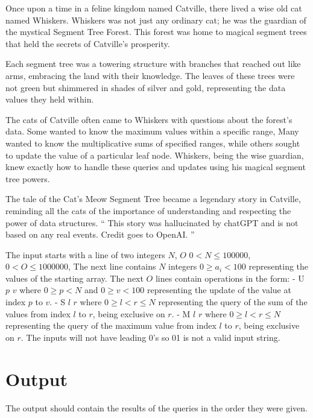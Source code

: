 Once upon a time in a feline kingdom named Catville, there lived a wise old cat named Whiskers. Whiskers was not just any ordinary cat; he was the guardian of the mystical Segment Tree Forest. This forest was home to magical segment trees that held the secrets of Catville's prosperity.

Each segment tree was a towering structure with branches that reached out like arms, embracing the land with their knowledge. The leaves of these trees were not green but shimmered in shades of silver and gold, representing the data values they held within.

The cats of Catville often came to Whiskers with questions about the forest's data. Some wanted to know the maximum values within a specific range, Many wanted to know the multiplicative sums of specified ranges, while others sought to update the value of a particular leaf node. Whiskers, being the wise guardian, knew exactly how to handle these queries and updates using his magical segment tree powers.

The tale of the Cat's Meow Segment Tree became a legendary story in Catville, reminding all the cats of the importance of understanding and respecting the power of data structures.
`` This story was hallucinated by chatGPT and is not based on any real events. Credit goes to OpenAI. '' 

{\setlength{\parindent}{0cm}
}
\begin{Input}
The input starts with a line of two integers $N$, $O$
{\setlength{\parindent}{0cm}
$0 < N \leq 100 000$,
$0 < O \leq 1 000 000$, 
The next line contains $N$ integers $0 \geq a_i < 100$ representing the values of the starting array.  
The next $O$ lines contain operations in the form:
    - U $p$ $v$ where $0 \geq p < N$ and $0 \geq v < 100$ representing the update of the value at index $p$ to $v$.
    - S $l$ $r$ where $0 \geq l < r \leq N$ representing the query of the sum of the values from index $l$ to $r$, being exclusive on $r$.
    - M $l$ $r$ where $0 \geq l < r \leq N$ representing the query of the maximum value from index $l$ to $r$, being exclusive on $r$.
}
{\setlength{\parindent}{0cm}
The inputs will not have leading 0's so 01 is not a valid input string.
}
\end{Input}

\section*{Output}
The output should contain the results of the queries in the order they were given. 
{\setlength{\parindent}{0cm}
}
